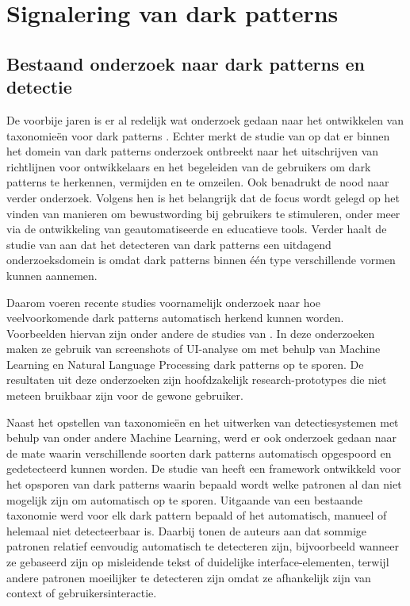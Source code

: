 \newpage

\section{Signalering van dark patterns}
\label{sec:signalering}

\subsection{Bestaand onderzoek naar dark patterns en detectie}
\label{subsec:bestaand-onderzoek}

\vspace{1em}

De voorbije jaren is er al redelijk wat onderzoek gedaan naar het ontwikkelen van taxonomieën voor dark patterns \autocite{Mansur2023}. Echter merkt de studie van \textcite{Mansur2023} op dat er binnen het domein van dark patterns onderzoek ontbreekt naar het uitschrijven van richtlijnen voor ontwikkelaars en het begeleiden van de gebruikers om dark patterns te herkennen, vermijden en te omzeilen. Ook \textcite{DiGeronimo2020} benadrukt de nood naar verder onderzoek. Volgens hen is het belangrijk dat de focus wordt gelegd op het vinden van manieren om bewustwording bij gebruikers te stimuleren, onder meer via de ontwikkeling van geautomatiseerde en educatieve tools. Verder haalt de studie van \textcite{Mansur2023} aan dat het detecteren van dark patterns een uitdagend onderzoeksdomein is omdat dark patterns binnen één type verschillende vormen kunnen aannemen. 

\vspace{1em}

Daarom voeren recente studies voornamelijk onderzoek naar hoe veelvoorkomende dark patterns automatisch herkend kunnen worden. Voorbeelden hiervan zijn onder andere de studies van \textcite{Mansur2023, Chen2024a, Chen2024}. In deze onderzoeken maken ze gebruik van screenshots of UI-analyse om met behulp van Machine Learning en Natural Language Processing dark patterns op te sporen. De resultaten uit deze onderzoeken zijn hoofdzakelijk research-prototypes die niet meteen bruikbaar zijn voor de gewone gebruiker.

\vspace{1em}

Naast het opstellen van taxonomieën en het uitwerken van detectiesystemen met behulp van onder andere Machine Learning, werd er ook onderzoek gedaan naar de mate waarin verschillende soorten dark patterns automatisch opgespoord en gedetecteerd kunnen worden. De studie van \textcite{Stavrakakis2021} heeft een framework ontwikkeld voor het opsporen van dark patterns waarin bepaald wordt welke patronen al dan niet mogelijk zijn om automatisch op te sporen. Uitgaande van een bestaande taxonomie werd voor elk dark pattern bepaald of het automatisch, manueel of helemaal niet detecteerbaar is. Daarbij tonen de auteurs aan dat sommige patronen relatief eenvoudig automatisch te detecteren zijn, bijvoorbeeld wanneer ze gebaseerd zijn op misleidende tekst of duidelijke interface-elementen, terwijl andere patronen moeilijker te detecteren zijn omdat ze afhankelijk zijn van context of gebruikersinteractie.

